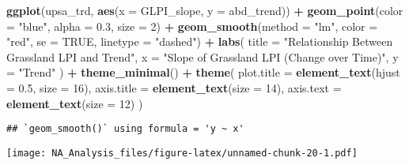 \documentclass[
]{article}
\newenvironment{Shaded}{\begin{snugshade}}{\end{snugshade}}
\newcommand{\AttributeTok}[1]{\textcolor[rgb]{0.13,0.29,0.53}{#1}}
\newcommand{\ConstantTok}[1]{\textcolor[rgb]{0.56,0.35,0.01}{#1}}
\newcommand{\DecValTok}[1]{\textcolor[rgb]{0.00,0.00,0.81}{#1}}
\newcommand{\FloatTok}[1]{\textcolor[rgb]{0.00,0.00,0.81}{#1}}
\newcommand{\FunctionTok}[1]{\textcolor[rgb]{0.13,0.29,0.53}{\textbf{#1}}}
\newcommand{\NormalTok}[1]{#1}
\newcommand{\SpecialCharTok}[1]{\textcolor[rgb]{0.81,0.36,0.00}{\textbf{#1}}}
\newcommand{\StringTok}[1]{\textcolor[rgb]{0.31,0.60,0.02}{#1}}
\begin{document}
\begin{Shaded}
\begin{Highlighting}[]
\FunctionTok{ggplot}\NormalTok{(upsa\_trd, }\FunctionTok{aes}\NormalTok{(}\AttributeTok{x =}\NormalTok{ GLPI\_slope, }\AttributeTok{y =}\NormalTok{ abd\_trend)) }\SpecialCharTok{+}
  \FunctionTok{geom\_point}\NormalTok{(}\AttributeTok{color =} \StringTok{"blue"}\NormalTok{, }\AttributeTok{alpha =} \FloatTok{0.3}\NormalTok{, }\AttributeTok{size =} \DecValTok{2}\NormalTok{) }\SpecialCharTok{+}  
  \FunctionTok{geom\_smooth}\NormalTok{(}\AttributeTok{method =} \StringTok{"lm"}\NormalTok{, }\AttributeTok{color =} \StringTok{"red"}\NormalTok{, }\AttributeTok{se =} \ConstantTok{TRUE}\NormalTok{, }\AttributeTok{linetype =} \StringTok{"dashed"}\NormalTok{) }\SpecialCharTok{+} 
  \FunctionTok{labs}\NormalTok{(}
    \AttributeTok{title =} \StringTok{"Relationship Between Grassland LPI and Trend"}\NormalTok{,}
    \AttributeTok{x =} \StringTok{"Slope of Grassland LPI (Change over Time)"}\NormalTok{,}
    \AttributeTok{y =} \StringTok{"Trend"}
\NormalTok{  ) }\SpecialCharTok{+}
  \FunctionTok{theme\_minimal}\NormalTok{() }\SpecialCharTok{+}
  \FunctionTok{theme}\NormalTok{(}
    \AttributeTok{plot.title =} \FunctionTok{element\_text}\NormalTok{(}\AttributeTok{hjust =} \FloatTok{0.5}\NormalTok{, }\AttributeTok{size =} \DecValTok{16}\NormalTok{),}
    \AttributeTok{axis.title =} \FunctionTok{element\_text}\NormalTok{(}\AttributeTok{size =} \DecValTok{14}\NormalTok{),}
    \AttributeTok{axis.text =} \FunctionTok{element\_text}\NormalTok{(}\AttributeTok{size =} \DecValTok{12}\NormalTok{)}
\NormalTok{  )}
\end{Highlighting}
\end{Shaded}

\begin{verbatim}
## `geom_smooth()` using formula = 'y ~ x'
\end{verbatim}

\texttt{[image: NA\_Analysis\_files/figure-latex/unnamed-chunk-20-1.pdf]}
\end{document}
